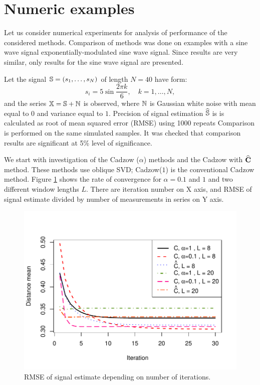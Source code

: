 \documentclass[sii]{ipart}
\begin{document}
\section{Numeric examples}
\label{sec:simul}
Let us consider numerical experiments for analysis of performance of the considered methods. Comparison of methods was done on examples with a sine wave signal exponentially-modulated sine wave signal.
Since results are very similar, only results for the sine wave signal are presented.

Let the signal $\mathbb{S} = (s_{1}, \ldots, s_N)$ of length $N = 40$ have form:
\begin{equation*}
s_{i} = 5\sin{\frac{2 \pi k}{6}}, \quad k = 1, \ldots, N,
\end{equation*}
and the series $\mathbb{X} = \mathbb{S} + \mathbb{N}$ is observed, where  $\mathbb{N}$ is Gaussian white noise with mean equal to $0$ and variance equal to $1$. Precision of signal estimation $\widehat{\mathbb{S}}$ is is calculated as root of mean squared error (RMSE) using 1000 repeats Comparison is performed on the same simulated samples. It was checked that comparison results are significant at 5\% level of significance.

We start with investigation of the Cadzow ($\alpha$) methods and the Cadzow with $\widehat {\mathbf{C}}$ method. These methods use oblique SVD; Cadzow($1$) is the conventional Cadzow method. Figure \ref{img_cadzowspeed2} shows the rate of convergence for $\alpha = 0.1$ and $1$ and two different window lengths $L$. There are iteration number on X axis, and RMSE of signal estimate divided by number of measurements in series on Y axis.

\begin{figure}[!hhh]
		\includegraphics[width = \columnwidth]{cadzowspeed_2.pdf}
		\caption{RMSE of signal estimate depending on number of iterations.}
		\label{img_cadzowspeed2}
\end{figure}
\end{document}
